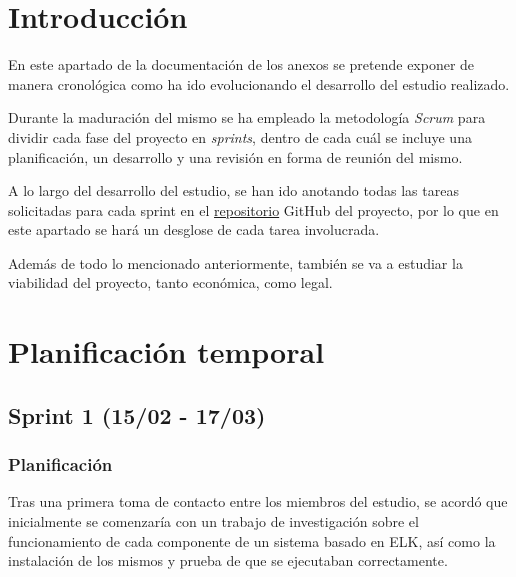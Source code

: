
\section{Introducción}
En este apartado de la documentación de los anexos se pretende exponer de manera cronológica como ha ido evolucionando el desarrollo del estudio realizado.

Durante la maduración del mismo se ha empleado la metodología \textit{Scrum} para dividir cada fase del proyecto en \textit{sprints}, dentro de cada cuál se incluye una planificación, un desarrollo y una revisión en forma de reunión del mismo.

A lo largo del desarrollo del estudio, se han ido anotando todas las tareas solicitadas para cada sprint en el \href{https://github.com/hds1001/Estudio-y-configuracion-de-un-sistema-ELK}{repositorio} GitHub del proyecto, por lo que en este apartado se hará un desglose de cada tarea involucrada.

Además de todo lo mencionado anteriormente, también se va a estudiar la viabilidad del proyecto, tanto económica, como legal.

\paragraph{}
\paragraph{}
\paragraph{}
\paragraph{}
\paragraph{}


\section{Planificación temporal}

\subsection{Sprint 1 (15/02 - 17/03)}
\subsubsection{Planificación}
Tras una primera toma de contacto entre los miembros del estudio, se acordó que inicialmente se comenzaría con un trabajo de investigación sobre el funcionamiento de cada componente de un sistema basado en ELK, así como la instalación de los mismos y prueba de que se ejecutaban correctamente.

